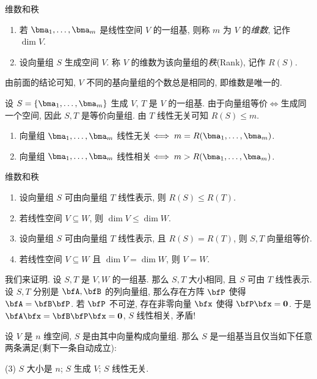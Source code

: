 \begin{frame}{维数和秩}
	\onslide<+->
	\begin{definition}
		\begin{enumerate}
			\item 若 $\bma_1,\dots,\bma_m$ 是线性空间 $V$ 的一组基, 则称 $m$ 为 $V$ 的\emph{维数}, 记作 $\dim V$.
			\item 设向量组 $S$ 生成空间 $V$.
			称 $V$ 的维数为该向量组的\emph{秩}(Rank), 记作 $R(S)$.
		\end{enumerate}
	\end{definition}
	\onslide<+->
	由前面的结论可知, $V$ 不同的基向量组的个数总是相同的, 即维数是唯一的.

	\onslide<+->
	设 $S=\{\bma_1,\dots,\bma_m\}$ 生成 $V$,
	\onslide<+->
	$T$ 是 $V$ 的一组基.
	\onslide<+->
	由于向量组等价$\iff$生成同一个空间, 因此 $S,T$ 是等价向量组.
	\onslide<+->
	由 $T$ 线性无关可知 $R(S)\le m$.
	\onslide<+->
	\begin{theorem}
		\begin{enumerate}
			\item 向量组 $\bma_1,\dots,\bma_m$ 线性无关$\iff m=R(\bma_1,\dots,\bma_m)$.
			\item 向量组 $\bma_1,\dots,\bma_m$ 线性相关$\iff m>R(\bma_1,\dots,\bma_m)$.
		\end{enumerate}
	\end{theorem}
\end{frame}


\begin{frame}{维数和秩}
	\onslide<+->
	\begin{theorem}
		\begin{enumerate}
			\item 设向量组 $S$ 可由向量组 $T$ 线性表示, 则 $R(S)\le R(T)$.
			\item 若线性空间 $V\subseteq W$, 则 $\dim V\le\dim W$.
			\item 设向量组 $S$ 可由向量组 $T$ 线性表示, 且 $R(S)=R(T)$, 则 $S,T$ 向量组等价.
			\item 若线性空间 $V\subseteq W$ 且 $\dim V=\dim W$, 则 $V=W$.
		\end{enumerate}
	\end{theorem}
	\onslide<+->
	我们来证明.
	\onslide<+->
	设 $S,T$ 是 $V,W$ 的一组基.
	\onslide<+->
	那么 $S,T$ 大小相同, 且 $S$ 可由 $T$ 线性表示.
	\onslide<+->
	设 $S,T$ 分别是 $\bfA,\bfB$ 的列向量组,
	\onslide<+->
	那么存在方阵 $\bfP$ 使得 $\bfA=\bfB\bfP$.
	\onslide<+->
	若 $\bfP$ 不可逆, 存在非零向量 $\bfx$ 使得 $\bfP\bfx={\bf0}$.
	\onslide<+->
	于是 $\bfA\bfx=\bfB\bfP\bfx={\bf0}$, $S$ 线性相关, 矛盾!
	\begin{theorem}
		设 $V$ 是 $n$ 维空间, $S$ 是由其中向量构成向量组.
		那么 $S$ 是一组基当且仅当如下任意两条满足(剩下一条自动成立):
		\begin{tasks}(3)
			\task $S$ 大小是 $n$;
			\task $S$ 生成 $V$;
			\task $S$ 线性无关.
		\end{tasks}
	\end{theorem}
\end{frame}



